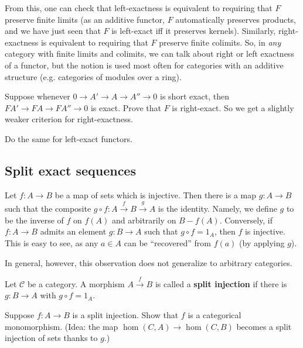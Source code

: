 From this, one can check that left-exactness is equivalent to requiring that $F$ preserve
finite limits (as an additive functor, $F$ automatically preserves products,
and we have just seen that $F$ is left-exact iff it preserves kernels).
Similarly, right-exactness is equivalent to requiring that $F$ preserve 
finite colimits.
So, in \emph{any}  category with finite limits and colimits, we can talk about
right or left exactness of a functor, but the notion is used most often for
categories with an additive structure (e.g. categories of modules over a ring).



\begin{exercise} 
Suppose whenever $0 \to A' \to A \to A'' \to 0$ is short exact, then $FA' \to
FA \to FA'' \to 0$ is exact. Prove that $F$ is right-exact. So we get a
slightly weaker criterion for right-exactness.

Do the same for left-exact functors.
\end{exercise} 




\subsection{Split exact sequences}

Let $f: A \to B$ be a map of sets which is injective. Then there is a map $g: A
\to B$ such that the composite $g \circ f: A \stackrel{f}{\to} B
\stackrel{g}{\to} A$ is the identity. Namely, we define $g$ to be the inverse
of $f$ on $f(A)$ and arbitrarily on $B-f(A)$.
Conversely, if $f: A \to B$ admits an element $g: B \to A$ such that $g \circ f
= 1_A$, then $f$ is injective. This is easy to see, as any $a \in A$ can be
``recovered'' from $f(a)$ (by applying $g$).

In general, however, this observation does not generalize to arbitrary
categories.

\begin{definition} 
Let $\mathcal{C}$ be a category. A morphism $A \stackrel{f}{\to} B$ is called a
\textbf{split injection} if there is $g: B \to A$ with $g \circ f = 1_A$.
\end{definition} 

\begin{exercise}
Suppose $f: A \to B$ is a split injection. Show that $f$ is a categorical monomorphism.
(Idea: the map $\hom(C,A) \to \hom(C,B)$ becomes a split injection of sets
thanks to $g$.)
\end{exercise} 

